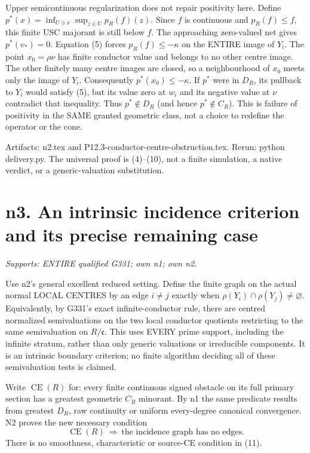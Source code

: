 \documentclass[11pt]{article}
\begin{document}
Upper semicontinuous regularization does not repair positivity here.
Define $p^*(x)=\inf_{U\ni x}\sup_{z\in U}p_R(f)(z)$. Since $f$ is
continuous and $p_R(f)\le f$, this finite USC majorant is still below
$f$. The approaching zero-valued net gives $p^*(v_*)=0$.
Equation (5) forces $p_R(f)\le-\kappa$ on the ENTIRE image of $Y_i$.
The point $x_0=\rho\nu$ has finite conductor value and belongs to no
other centre image. The other finitely many centre images are closed, so
a neighbourhood of $x_0$ meets only the image of $Y_i$. Consequently
$p^*(x_0)\le-\kappa$. If $p^*$ were in $D_R$, its pullback to $Y_i$
would satisfy (5), but its value zero at $w_i$ and its negative value
at $\nu$ contradict that inequality. Thus $p^*\notin D_R$ (and hence
$p^*\notin C_R$). This is failure of positivity in the SAME granted
geometric class, not a choice to redefine the operator or the cone.

Artifacts: n2.tex and P12.3-conductor-centre-obstruction.tex. Rerun:
python delivery.py. The universal proof is (4)--(10), not a finite
simulation, a native verdict, or a generic-valuation substitution.

\section{n3. An intrinsic incidence criterion and its precise remaining case}
\textit{Supports: ENTIRE qualified G331; own n1; own n2.}

Use n2's general excellent reduced setting. Define the finite graph on the
actual normal LOCAL CENTRES by an edge $i\ne j$ exactly when
$\rho(Y_i)\cap\rho(Y_j)\ne\varnothing$. Equivalently, by G331's exact
infinite-conductor rule, there are centred normalized semivaluations on
the two local conductor quotients restricting to the same semivaluation
on $R/\mathfrak c$. This uses EVERY prime support, including the infinite
stratum, rather than only generic valuations or irreducible components.
It is an intrinsic boundary criterion; no finite algorithm deciding all
of these semivaluation tests is claimed.

Write $\operatorname{CE}(R)$ for: every finite continuous signed obstacle
on its full primary section has a greatest geometric $C_R$ minorant.
By n1 the same predicate results from greatest $D_R$, raw continuity or
uniform every-degree canonical convergence. N2 proves the new necessary
condition
\[
                 \operatorname{CE}(R)\ \Longrightarrow\
                 \text{the incidence graph has no edges}.       \tag{11}
\]
There is no smoothness, characteristic or source-CE condition in (11).
\end{document}
